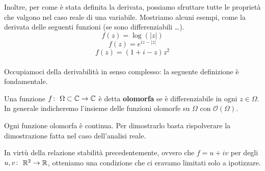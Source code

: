 Inoltre, per come è stata definita la derivata, possiamo sfruttare tutte le proprietà che valgono nel caso reale di una variabile. Mostriamo alcuni esempi, come la derivata delle seguenti funzioni (se sono differenziabili \dots). \\

	$$f(z) = \log(|z|) $$ 
	$$ f(z) = e^{iz - |z|} $$ 
	$$ f(z) = (1 + i - z)z^2 $$
\\

Occupiamoci della derivabilità in senso complesso: la seguente definizione è fondamentale.

\begin{definition}
	Una funzione $f \colon\ \Omega \subset \mathbb{C} \rightarrow \mathbb{C}$ è detta \textbf{olomorfa} se è differenziabile in ogni $z \in \Omega$. \\ In generale indicheremo l'insieme delle funzioni olomorfe su $\Omega$ con $\mathcal{O}(\Omega)$.
\end{definition}

\begin{remark}
	Ogni funzione olomorfa è continua. Per dimostrarlo basta rispolverare la dimostrazione fatta nel caso dell'analisi reale.
\end{remark}

In virtù della relazione stabilità precedentemente, ovvero che $f = u + iv$ per degli $u,v \colon\ \mathbb{R}^2 \rightarrow \mathbb{R}$, otteniamo una condizione che ci eravamo limitati solo a ipotizzare.

